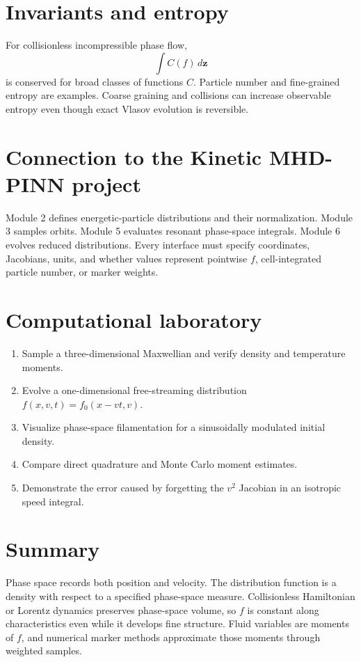 \documentclass[11pt]{article}
\begin{document}
\section{Invariants and entropy}
For collisionless incompressible phase flow,
\begin{equation}
\int C(f)\,d\mathbf z
\end{equation}
is conserved for broad classes of functions $C$. Particle number and fine-grained entropy are examples. Coarse graining and collisions can increase observable entropy even though exact Vlasov evolution is reversible.

\section{Connection to the Kinetic MHD-PINN project}
Module 2 defines energetic-particle distributions and their normalization. Module 3 samples orbits. Module 5 evaluates resonant phase-space integrals. Module 6 evolves reduced distributions. Every interface must specify coordinates, Jacobians, units, and whether values represent pointwise $f$, cell-integrated particle number, or marker weights.

\section{Computational laboratory}
\begin{enumerate}[leftmargin=1.6em]
\item Sample a three-dimensional Maxwellian and verify density and temperature moments.
\item Evolve a one-dimensional free-streaming distribution $f(x,v,t)=f_0(x-vt,v)$.
\item Visualize phase-space filamentation for a sinusoidally modulated initial density.
\item Compare direct quadrature and Monte Carlo moment estimates.
\item Demonstrate the error caused by forgetting the $v^2$ Jacobian in an isotropic speed integral.
\end{enumerate}

\section{Summary}
Phase space records both position and velocity. The distribution function is a density with respect to a specified phase-space measure. Collisionless Hamiltonian or Lorentz dynamics preserves phase-space volume, so $f$ is constant along characteristics even while it develops fine structure. Fluid variables are moments of $f$, and numerical marker methods approximate those moments through weighted samples.
\end{document}
